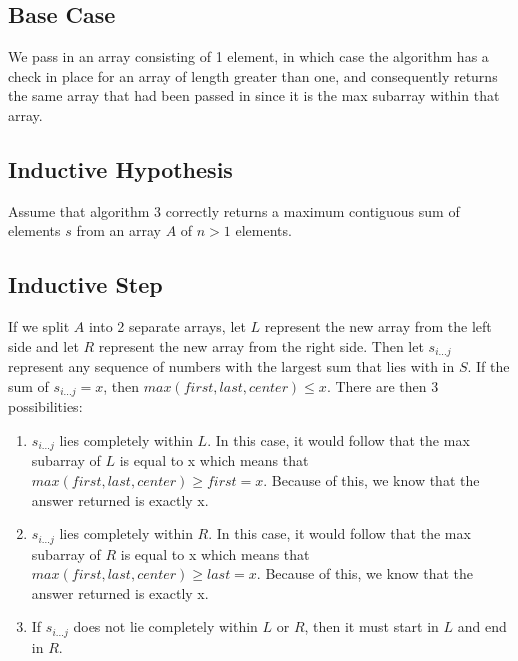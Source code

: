 \documentclass[11pt,letterpaper]{article}
\begin{document}
\subsection*{Base Case}
We pass in an array consisting of 1 element, in which case the algorithm has a check in place for an array of length greater than one, and consequently returns the same array that had been passed in since it is the max subarray within that array.

\subsection*{Inductive Hypothesis}
Assume that algorithm 3 correctly returns a maximum contiguous sum of elements $s$ from an array $A$ of $n > 1$ elements. 

\subsection*{Inductive Step}
If we split $A$ into 2 separate arrays, let $L$ represent the new array from the left side and let $R$ represent the new array from the right side. Then let $s_{i...j}$ represent any sequence of numbers with the largest sum that lies with in $S$. If the sum of $s_{i...j} = x$, then $max(first, last, center) \leq x$. There are then 3 possibilities:
\begin{enumerate}
\item $s_{i...j}$ lies completely within $L$. In this case, it would follow that the max subarray of $L$ is equal to x which means that $max(first, last, center) \geq first = x$. Because of this, we know that the answer returned is exactly x.
\item $s_{i...j}$ lies completely within $R$. In this case, it would follow that the max subarray of $R$ is equal to x which means that $max(first, last, center) \geq last = x$. Because of this, we know that the answer returned is exactly x.
\item If $s_{i...j}$ does not lie completely within $L$ or $R$, then it must start in $L$ and end in $R$. 
\end{enumerate}
\end{document}
